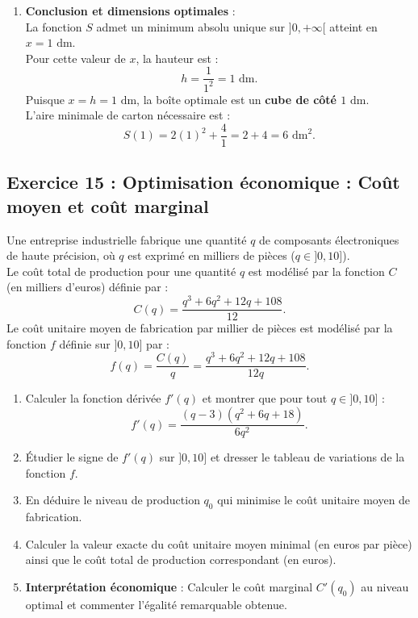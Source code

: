 \documentclass[11pt,a4paper]{article}
\begin{document}
\begin{correctionbox}
\begin{enumerate}[label=\textbf{\arabic*.}]
    \item \textbf{Conclusion et dimensions optimales} :\\
    La fonction $S$ admet un minimum absolu unique sur $]0, +\infty[$ atteint en $x = 1\text{ dm}$.\\
    Pour cette valeur de $x$, la hauteur est :
    \[
    h = \frac{1}{1^2} = 1\text{ dm}.
    \]
    Puisque $x = h = 1\text{ dm}$, la boîte optimale est un \textbf{cube de côté $1\text{ dm}$}.\\
    L'aire minimale de carton nécessaire est :
    \[
    S(1) = 2(1)^2 + \frac{4}{1} = 2 + 4 = 6\text{ dm}^2.
    \]
\end{enumerate}
\end{correctionbox}

\subsection*{Exercice 15 : Optimisation économique : Coût moyen et coût marginal}

Une entreprise industrielle fabrique une quantité $q$ de composants électroniques de haute précision, où $q$ est exprimé en milliers de pièces ($q \in ]0, 10]$).\\
Le coût total de production pour une quantité $q$ est modélisé par la fonction $C$ (en milliers d'euros) définie par :
\[
C(q) = \frac{q^3 + 6q^2 + 12q + 108}{12}.
\]
Le coût unitaire moyen de fabrication par millier de pièces est modélisé par la fonction $f$ définie sur $]0, 10]$ par :
\[
f(q) = \frac{C(q)}{q} = \frac{q^3 + 6q^2 + 12q + 108}{12q}.
\]
\begin{enumerate}[label=\textbf{\arabic*.}]
    \item Calculer la fonction dérivée $f'(q)$ et montrer que pour tout $q \in ]0, 10]$ :
    \[
    f'(q) = \frac{(q - 3)(q^2 + 6q + 18)}{6q^2}.
    \]
    \item Étudier le signe de $f'(q)$ sur $]0, 10]$ et dresser le tableau de variations de la fonction $f$.
    \item En déduire le niveau de production $q_0$ qui minimise le coût unitaire moyen de fabrication.
    \item Calculer la valeur exacte du coût unitaire moyen minimal (en euros par pièce) ainsi que le coût total de production correspondant (en euros).
    \item \textbf{Interprétation économique} : Calculer le coût marginal $C'(q_0)$ au niveau optimal et commenter l'égalité remarquable obtenue.
\end{enumerate}
\end{document}
